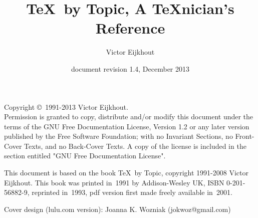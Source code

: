 
\title{\TeX\ by Topic, A \TeX nician's Reference}
\date{document revision 1.4, December 2013}
\author{Victor Eijkhout}
\maketitle

\thispagestyle{empty}
\hbox{}\vfill\hbox{}\pagebreak
\setcounter{page}{1}

  \begin{minipage}[h]{1.0\linewidth}\parskip 15pt
  Copyright \copyright\  1991-2013 Victor Eijkhout.\\
  Permission is granted to copy, distribute and/or modify this document
  under the terms of the GNU Free Documentation License, Version 1.2
  or any later version published by the Free Software Foundation;
  with no Invariant Sections, no Front-Cover Texts, and no Back-Cover
  Texts.  A copy of the license is included in the section entitled "GNU
  Free Documentation License".

This document is based on the book \TeX\ by Topic,
copyright 1991-2008 Victor Eijkhout. This book was
printed in~1991 by Addison-Wesley UK, ISBN 0-201-56882-9, reprinted
in~1993, pdf version first made freely available in~2001.

Cover design (lulu.com version): Joanna K. Wozniak (jokwoz@gmail.com)

\begin{comment}
Revision history:\\
1.0 first open source release, 2007/09/29\\
1.1 fixed some missing control sequence names 
(replace \cs{cstoidx} by \cs{csterm})\\
1.2 cleaned up most typographic accidents.
\\ svn revision \svnrev, \svndate
\end{comment}

  \end{minipage}
\pagebreak
